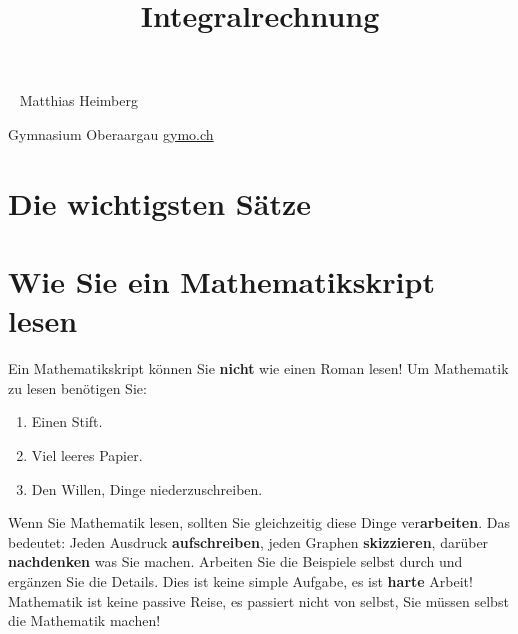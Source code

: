 \documentclass[justified,openany,nofonts]{tufte-book}
\title{Integralrechnung}
\begin{document}
\maketitle



\begin{fullwidth}
~\vfill
\thispagestyle{empty}
\setlength{\parindent}{0pt}
\setlength{\parskip}{\baselineskip}
Matthias Heimberg

Gymnasium Oberaargau \url{gymo.ch}



\end{fullwidth}


\tableofcontents





\chapter*{Die wichtigsten Sätze}%



\chapter*{Wie Sie ein Mathematikskript lesen}

Ein Mathematikskript können Sie \textbf{nicht} wie einen Roman lesen! Um Mathematik zu lesen benötigen Sie:
\begin{enumerate}
\item Einen Stift.
\item Viel leeres Papier.
\item Den Willen, Dinge niederzuschreiben.
\end{enumerate}
Wenn Sie Mathematik lesen, sollten Sie gleichzeitig diese Dinge ver\textbf{arbeiten}. Das bedeutet: Jeden Ausdruck \textbf{aufschreiben}, jeden Graphen \textbf{skizzieren}, darüber \textbf{nachdenken} was Sie machen. Arbeiten Sie die Beispiele selbst durch und ergänzen Sie die Details. Dies ist keine simple Aufgabe, es ist \textbf{harte} Arbeit! Mathematik ist keine passive Reise, es passiert nicht von selbst, Sie müssen selbst die Mathematik machen!



\setcounter{chapter}{0}
\end{document}
